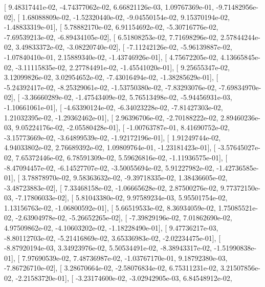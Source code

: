\documentclass{article}
\begin{document}
       [  9.48317441e-02,  -4.74377062e-02,   6.66821126e-03,
          1.09767369e-01,  -9.71482956e-02],
       [  1.68088809e-02,  -1.52320440e-02,  -9.04550154e-02,
          9.15370194e-02,  -1.48833319e-01],
       [  5.78882170e-02,   6.91154692e-02,  -5.30716776e-02,
         -7.69539213e-02,  -6.89434105e-02],
       [  6.51808253e-02,   7.71698296e-02,   2.57844244e-02,
          3.49833372e-02,  -3.08220740e-02],
       [ -7.11242126e-02,  -5.96139887e-02,  -1.07840410e-01,
          2.15889340e-02,  -1.43746926e-01],
       [  4.75672205e-02,   4.13665845e-02,  -3.11115835e-02,
          2.27784491e-02,  -1.45541020e-01],
       [  9.25655347e-02,   3.12099826e-02,   3.02954652e-02,
         -7.43016494e-02,  -1.38285629e-01],
       [ -5.24392417e-02,  -8.25329061e-02,  -1.53750380e-02,
         -7.83293076e-02,  -7.69834970e-02],
       [ -3.36660289e-02,  -1.47543409e-02,   5.76513498e-02,
         -5.94456931e-03,  -1.10661061e-01],
       [ -4.63390124e-02,  -6.34023228e-02,  -7.81427303e-02,
          1.21032395e-02,  -1.29362462e-01],
       [  2.96396706e-02,  -2.70188222e-02,   2.89460236e-03,
          9.05224176e-02,  -2.05580428e-01],
       [ -1.00763787e-01,   8.41690752e-02,  -3.15773669e-02,
         -3.64899539e-02,  -1.92172196e-01],
       [  1.91249744e-02,   4.94033802e-02,   2.76689392e-02,
          1.09809764e-01,  -1.23181423e-01],
       [ -3.57645027e-02,   7.65372446e-02,   6.78591309e-02,
          5.59626816e-02,  -1.11936575e-01],
       [ -8.47094457e-02,  -6.14527707e-02,  -3.50055694e-02,
          5.91227982e-02,  -1.42736585e-01],
       [  3.78878970e-02,   9.58363632e-02,  -9.39718335e-02,
          1.38436605e-02,  -3.48723883e-02],
       [  7.33468158e-02,  -1.06665628e-02,   2.87500276e-02,
          9.77372150e-03,  -7.17806033e-02],
       [  5.81043380e-02,   9.97589234e-03,   5.95501754e-02,
          1.13156763e-02,  -1.06800592e-01],
       [  5.66519533e-02,   8.36934059e-02,   1.75085521e-02,
         -2.63904978e-02,  -5.26652265e-02],
       [ -7.39829196e-02,   7.01862690e-02,   4.97509862e-02,
         -4.10603202e-02,  -1.18228490e-01],
       [  9.47736217e-03,  -8.80112703e-02,  -5.21416869e-02,
          3.65336983e-02,  -2.02234475e-01],
       [ -8.87920194e-03,   3.34923976e-02,   5.50534491e-02,
         -8.38943317e-02,  -1.51990838e-01],
       [  7.97690539e-02,   7.48736987e-02,  -1.03767170e-01,
          9.18792380e-03,  -7.86726710e-02],
       [  3.28670664e-02,  -2.58076834e-02,   6.75311231e-02,
          3.21507856e-02,  -2.21583720e-01],
       [ -3.23174600e-02,  -3.02942905e-03,   6.84548912e-02,
\end{document}
